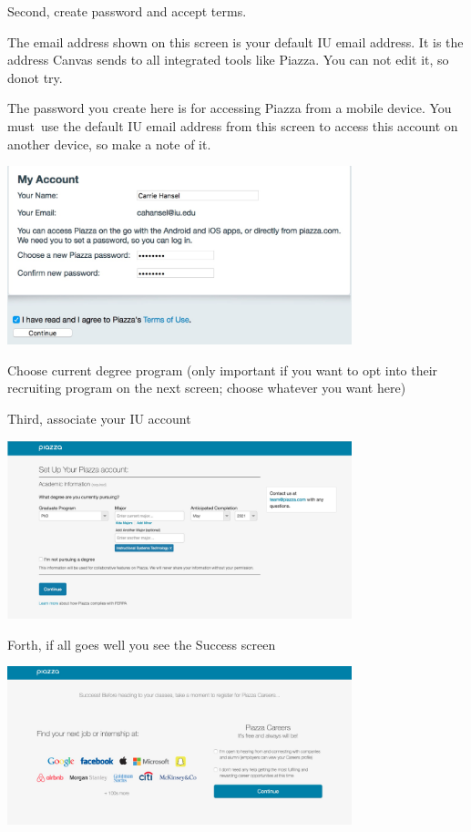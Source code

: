 Second, create password and accept terms.


The email address shown on this screen is your default IU
email address. It is the address Canvas sends to all integrated tools
like Piazza. You can not edit it, so donot try.

The password you create here is for accessing Piazza from a
mobile device. You must~use the default IU email address from this
screen to access this account on another device, so make a note of it.

\includegraphics[width=0.75\textwidth]{images/piazza/image1.png}

Choose current degree program (only important if you want to opt into
their recruiting program on the next screen; choose whatever you want
here)

Third, associate your IU account

\includegraphics[width=0.75\textwidth]{images/piazza/image4.png}

Forth, if all goes well you see the Success screen

\includegraphics[width=0.75\textwidth]{images/piazza/image2.png}

